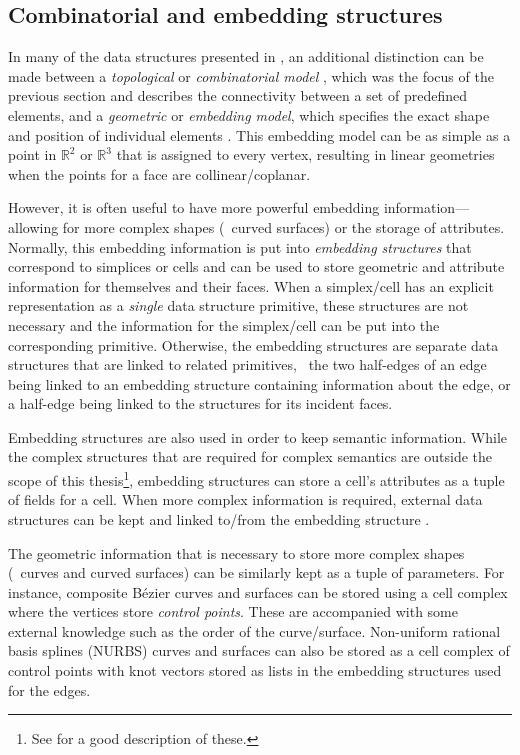 \subsection{Combinatorial and embedding structures}
\label{ss:combinatorial-embedding}

In many of the data structures presented in , an additional distinction can be made between a \emph{topological} or \emph{combinatorial model} \citep{Lienhardt91}, which was the focus of the previous section and describes the connectivity between a set of predefined elements, and a \emph{geometric} or \emph{embedding model}, which specifies the exact shape and position of individual elements \citep{Mantyla88}.
This embedding model can be as simple as a point in $\mathbb{R}^2$ or $\mathbb{R}^3$ that is assigned to every vertex, resulting in linear geometries when the points for a face are collinear/coplanar.

However, it is often useful to have more powerful embedding information---allowing for more complex shapes (\eg\ curved surfaces) or the storage of attributes.
Normally, this embedding information is put into \emph{embedding structures} that correspond to simplices or cells and can be used to store geometric and attribute information for themselves and their faces.
When a simplex/cell has an explicit representation as a \emph{single} data structure primitive, these structures are not necessary and the information for the simplex/cell can be put into the corresponding primitive.
Otherwise, the embedding structures are separate data structures that are linked to related primitives, \eg\ the two half-edges of an edge being linked to an embedding structure containing information about the edge, or a half-edge being linked to the structures for its incident faces.

Embedding structures are also used in order to keep semantic information.
While the complex structures that are required for complex semantics are outside the scope of this thesis\footnote{See \citet{Biljecki14} for a good description of these.}, embedding structures can store a cell's attributes as a tuple of fields for a cell.
When more complex information is required, external data structures can be kept and linked to/from the embedding structure \citep{Kuhn05}.

The geometric information that is necessary to store more complex shapes (\eg\ curves and curved surfaces) can be similarly kept as a tuple of parameters.
For instance, composite B\'ezier curves and surfaces \citep{Bezier77} can be stored using a cell complex where the vertices store \emph{control points}.
These are accompanied with some external knowledge such as the order of the curve/surface.
Non-uniform rational basis splines (NURBS) curves and surfaces \citep{Versprille75} can also be stored as a cell complex of control points with knot vectors stored as lists in the embedding structures used for the edges.

